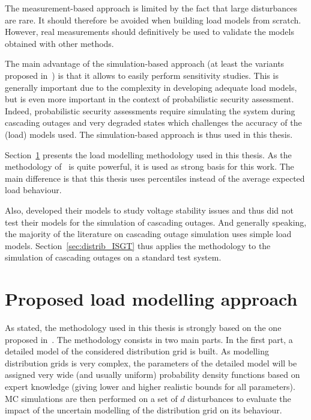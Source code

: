 The measurement-based approach is limited by the fact that large disturbances are rare. It should therefore be avoided when building load models from scratch. However, real measurements should definitively be used to validate the models obtained with other methods.

The main advantage of the simulation-based approach (at least the variants proposed in~\cite{ChaspierreThesis, ChaspierrePaper, Vorwerk}) is that it allows to easily perform sensitivity studies. This is generally important due to the complexity in developing adequate load models, but is even more important in the context of probabilistic security assessment. Indeed, probabilistic security assessments require simulating the system during cascading outages and very degraded states which challenges the accuracy of the (load) models used. The simulation-based approach is thus used in this thesis.

Section~\ref{sec:distrib_methodology} presents the load modelling methodology used in this thesis. As the methodology of~\cite{ChaspierreThesis, ChaspierrePaper} is quite powerful, it is used as strong basis for this work. The main difference is that this thesis uses percentiles instead of the average expected load behaviour.

Also, \cite{ChaspierreThesis, ChaspierrePaper} developed their models to study voltage stability issues and thus did not test their models for the simulation of cascading outages. And generally speaking, the majority of the literature on cascading outage simulation uses simple load models. Section~\ref{sec:distrib_ISGT} thus applies the methodology to the simulation of cascading outages on a standard test system.



\section{Proposed load modelling approach}
\label{sec:distrib_methodology}

As stated, the methodology used in this thesis is strongly based on the one proposed in~\cite{ChaspierrePaper, ChaspierreThesis}. The methodology consists in two main parts. In the first part, a detailed model of the considered distribution grid is built. As modelling distribution grids is very complex, the parameters of the detailed model will be assigned very wide (and usually uniform) probability density functions based on expert knowledge (giving lower and higher realistic bounds for all parameters). MC simulations are then performed on a set of \(d\) disturbances to evaluate the impact of the uncertain modelling of the distribution grid on its behaviour.

